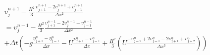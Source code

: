 \documentclass[12pt]{article}
\begin{document}
\begin{multline}
\upsilon^{n+1}_j - \frac{H^2}{3}\frac{\upsilon^{n+1}_{j+1} -2\upsilon^{n+1}_{j} +\upsilon^{n+1}_{j-1} }{\Delta x^2} 
\\ =  \upsilon^{n-1}_j - \frac{H^2}{3}\frac{\upsilon^{n-1}_{j+1} -2\upsilon^{n-1}_{j} +\upsilon^{n-1}_{j-1}}{\Delta x^2}   \\+  \Delta t\left(- g\frac{\eta^n_{j+1} -\eta^n_{j-1} }{\Delta x}   - U\frac{\upsilon^n_{j+1} -\upsilon^n_{j-1} }{\Delta x} + \frac{H^2}{3}\left(U \frac{-\upsilon^{n}_{j-2} +2\upsilon^{n}_{j-1} -2\upsilon^{n}_{j+1} +\upsilon^{n}_{j+2}}{\Delta x^3}  \right)\right)  \\
\end{multline}
\end{document}

